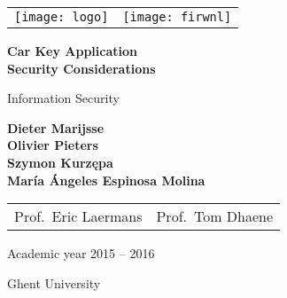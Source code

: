 \begin{center}

\begin{tabular}{L{7cm}R{7cm}}
  \texttt{[image: logo]} & \texttt{[image: firwnl]}
\end{tabular}

\vspace{6cm}



{\Huge\textbf{Car Key Application}}\\
\vspace{2em}
{\Large\textbf{Security Considerations}}

\vspace{1cm}

{\huge Information Security}

\vfill

{\vspace{0.4cm}
\vspace{0.2cm}
\textbf{Dieter Marijsse} \\
\textbf{Olivier Pieters} \\
\textbf{Szymon Kurzępa} \\
\textbf{María Ángeles Espinosa Molina} \\
}

\vspace{5cm}

\begin{tabular}{cc}
    Prof.\ Eric Laermans &
    Prof.\ Tom Dhaene
\end{tabular}

\vspace{0.5cm}

Academic year 2015 -- 2016


Ghent University

\end{center}
